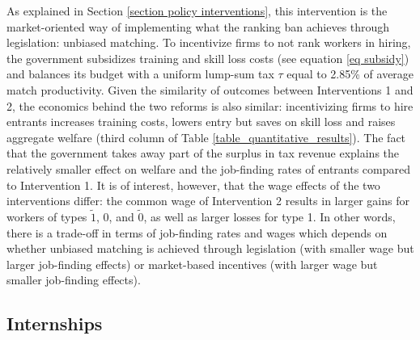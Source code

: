\documentclass[12pt]{article} %
\theoremstyle{definition}
\begin{document}
As explained in Section \ref{section policy interventions}, this intervention is the market-oriented way of implementing what the ranking ban achieves through legislation: unbiased matching.
To incentivize firms to not rank workers in hiring, the government subsidizes training and skill loss costs (see equation \ref{eq subsidy}) and balances its budget with a uniform lump-sum tax $\tau$ equal to 2.85\% of average match productivity.  
Given the similarity of outcomes between Interventions 1 and 2, the economics behind the two reforms is also similar: incentivizing firms to hire entrants increases training costs, lowers entry but saves on skill loss and raises aggregate welfare (third column of Table \ref{table_quantitative_results}).
The fact that the government takes away part of the surplus in tax revenue explains the relatively smaller effect on welfare and the job-finding rates of entrants compared to Intervention 1.
It is of interest, however, that the wage effects of the two interventions differ: the common wage of Intervention 2 results in larger gains for workers of types $\tilde{1}$, 0, and $\tilde{0}$, as well as larger losses for type 1.
In other words, there is a trade-off in terms of job-finding rates and wages which depends on whether unbiased matching is achieved through legislation (with smaller wage but larger job-finding effects) or market-based incentives (with larger wage but smaller job-finding effects).



\subsection{Internships} \label{section internships quant}
\end{document}
